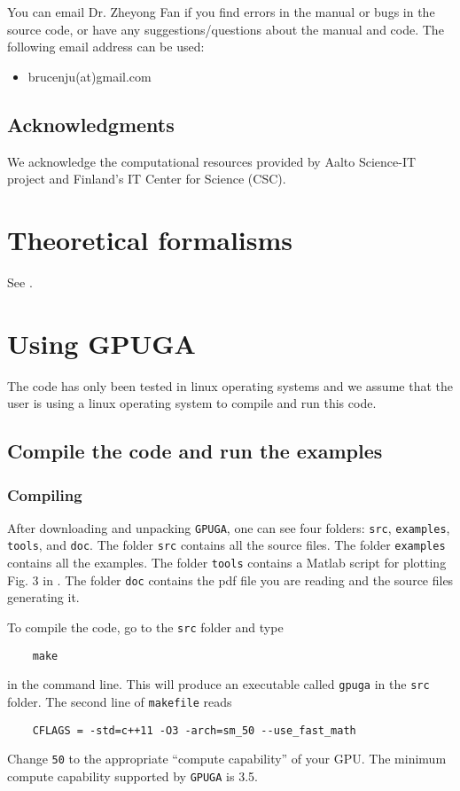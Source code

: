 \documentclass[12pt,a4paper]{report}
\begin{document}
You can email Dr. Zheyong Fan if you find errors in the manual or bugs in the source code, or have any suggestions/questions about the manual and code. The following email address can be used:
\begin{itemize}
\item brucenju(at)gmail.com
\end{itemize}

\section{Acknowledgments}
We acknowledge the computational resources provided by Aalto Science-IT project and Finland's IT Center for Science (CSC).

\chapter{Theoretical formalisms\label{section:theory}}

See \cite{fan2019arxiv}. 

\chapter{Using GPUGA \label{section:usage}}

The code has only been tested in linux operating systems and we assume that the user is using a linux operating system to compile and run this code.

\section{Compile the code and run the examples}

\subsection{Compiling}

After downloading and unpacking \verb"GPUGA", one can see four folders:  \verb"src",  \verb"examples",  \verb"tools", and \verb"doc". The folder \verb"src" contains all the source files. The folder \verb"examples" contains all the examples. The folder \verb"tools" contains a Matlab script for plotting Fig. 3 in \cite{fan2019arxiv}. The folder \verb"doc" contains the pdf file you are reading and the source files generating it.

To compile the code, go to the \verb"src" folder and type
\begin{verbatim}
    make
\end{verbatim}
in the command line. This will produce an executable called \verb"gpuga" in the \verb"src" folder. The second line of \verb"makefile" reads
\begin{verbatim}
    CFLAGS = -std=c++11 -O3 -arch=sm_50 --use_fast_math
\end{verbatim}
Change \verb"50" to the appropriate ``compute capability'' of your GPU. The minimum compute capability supported by \verb"GPUGA" is 3.5.
\end{document}
